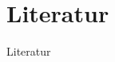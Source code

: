\documentclass[ngerman,compress,hyperref={bookmarks}]{beamer}
\begin{document}
\section{Literatur}
\begin{frame}[plain]{Literatur}
\scriptsize


\end{frame}
\end{document}
